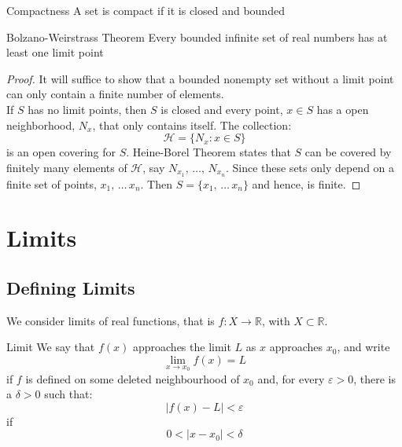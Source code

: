 \documentclass{article}
\newcommand{\R}{\mathbb{R}}
\newcommand{\sub}{\subset}
\renewcommand{\d}{\delta}
\newcommand{\e}{\varepsilon}
\begin{document}
\begin{definition}{Compactness}{}
  A set is {\color{blue} compact }if it is closed and bounded
\end{definition}\vspace{10pt}

\begin{theorem}{Bolzano-Weirstrass Theorem}{}
  Every bounded infinite set of real numbers has at least one limit point
\end{theorem}

\begin{proof}
  It will suffice to show that a bounded nonempty set without a limit point can only contain a finite number of elements. \\

  If $S$ has no limit points, then $S$ is closed and every point, $x \in S$ has a open neighborhood, $N_x$, that only contains itself. The collection:
  $$ \mathcal{H} = \{ N_x : x \in S \} $$
  is an open covering for $S$. Heine-Borel Theorem states that $S$ can be covered by finitely many elements of $\mathcal{H}$, say $N_{x_1},\, \dots ,\, N_{x_n}$. Since these sets only depend on a finite set of points, $x_1, \, \dots \, x_n$. Then $S = \{ x_1, \, \dots \, x_n \}$ and hence, is finite.
\end{proof}


\newpage\section{Limits}
\subsection{Defining Limits}

We consider limits of real functions, that is $f: X \to \R$, with $X\sub\R$.

\noindent\begin{definition}{Limit}{}
 We say that $f(x)$ approaches the limit $L$ as $x$ approaches $x_0$, and write
 $$ \lim_{x\to x_0}{f(x)} = L$$
 if $f$ is defined on some deleted neighbourhood of $x_0$ and, for every $\e > 0$, there is a $\d > 0$ such that:
 $$ |f(x) - L| < \e $$
 if
 $$ 0 < |x - x_0| < \d $$
\end{definition}\vspace{10pt}
\end{document}
